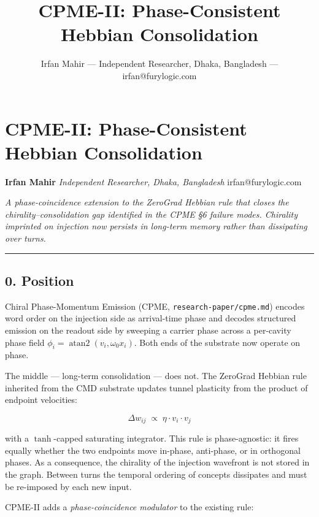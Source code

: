 \documentclass[
  11pt,
  a4paper,
]{article}
\title{CPME-II: Phase-Consistent Hebbian Consolidation}
\author{Irfan Mahir --- Independent Researcher, Dhaka, Bangladesh ---
irfan@furylogic.com}
\date{}
\begin{document}
\maketitle

{
\hypersetup{linkcolor=}
\setcounter{tocdepth}{3}
\tableofcontents
}
\section{CPME-II: Phase-Consistent Hebbian
Consolidation}\label{cpme-ii-phase-consistent-hebbian-consolidation}

\textbf{Irfan Mahir} \emph{Independent Researcher, Dhaka, Bangladesh}
irfan@furylogic.com

\emph{A phase-coincidence extension to the ZeroGrad Hebbian rule that
closes the chirality--consolidation gap identified in the CPME §6
failure modes. Chirality imprinted on injection now persists in
long-term memory rather than dissipating over turns.}

\begin{center}\rule{0.5\linewidth}{0.5pt}\end{center}

\subsection{0. Position}\label{position}

Chiral Phase-Momentum Emission (CPME, \texttt{research-paper/cpme.md})
encodes word order on the injection side as arrival-time phase and
decodes structured emission on the readout side by sweeping a carrier
phase across a per-cavity phase field
\(\phi_i = \operatorname{atan2}(v_i, \omega_0 x_i)\). Both ends of the
substrate now operate on phase.

The middle --- long-term consolidation --- does not. The ZeroGrad
Hebbian rule inherited from the CMD substrate updates tunnel plasticity
from the product of endpoint velocities:

\[
\Delta w_{ij} \;\propto\; \eta \cdot v_i \cdot v_j
\]

with a \(\tanh\)-capped saturating integrator. This rule is
phase-agnostic: it fires equally whether the two endpoints move
in-phase, anti-phase, or in orthogonal phases. As a consequence, the
chirality of the injection wavefront is not stored in the graph. Between
turns the temporal ordering of concepts dissipates and must be
re-imposed by each new input.

CPME-II adds a \emph{phase-coincidence modulator} to the existing rule:
\end{document}
